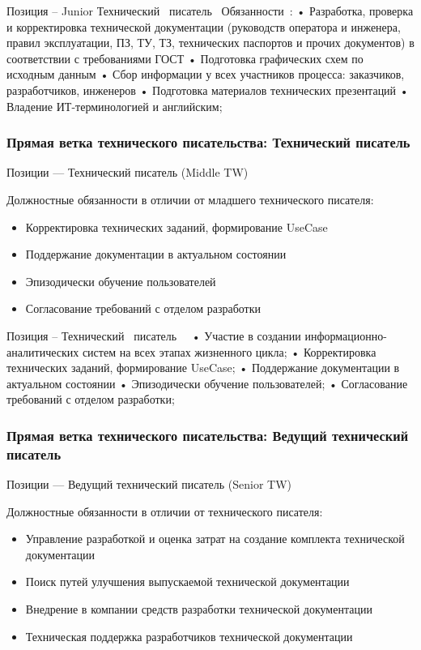 \documentclass{../industrial-development}
\begin{document}
{\lecturenotes
Позиция – Junior Технический~\cite{hh} писатель~\cite{itcf}
Обязанности~\cite{rab}:
•	Разработка, проверка и корректировка технической документации (руководств оператора и инженера, правил эксплуатации, ПЗ, ТУ, ТЗ, технических паспортов и прочих документов) в соответствии с требованиями ГОСТ 
•	Подготовка графических схем по исходным данным
•	Сбор информации у всех участников процесса: заказчиков, разработчиков, инженеров
•	Подготовка материалов технических презентаций
•	Владение ИТ-терминологией и английским;

\begin{frame} \frametitle{Прямая ветка технического писательства: Технический писатель }
  \begin{block}{}
  \alert{Позиции --- Технический писатель (Middle TW) }

Должностные обязанности в отличии от младшего технического писателя: 
  \end{block}
  \begin{itemize}
  \item Корректировка технических заданий, формирование UseCase
  \item  Поддержание документации в актуальном состоянии
  \item Эпизодически обучение пользователей
 \item 	Согласование требований с отделом разработки
  \end{itemize}
\end{frame}


\lecturenotes
Позиция –  Технический~\cite{hh} писатель~\cite{itcf}~\cite{rab}
•	Участие в создании информационно-аналитических систем на всех этапах жизненного цикла;
•	Корректировка технических заданий, формирование UseCase;
•	Поддержание документации в актуальном состоянии
•	Эпизодически обучение пользователей;
•	Согласование требований с отделом разработки;

\begin{frame} \frametitle{Прямая ветка технического писательства: Ведущий технический писатель }
  \begin{block}{}
  \alert{Позиции --- Ведущий технический писатель (Senior TW) }

Должностные обязанности в отличии от технического писателя: 
  \end{block}
  \begin{itemize}
  \item Управление разработкой и оценка затрат на создание комплекта технической документации
  \item Поиск путей улучшения выпускаемой технической документации
  \item Внедрение в компании средств разработки технической документации
 \item 	 Техническая поддержка разработчиков технической документации
  \end{itemize}
\end{frame}

}
\end{document}
